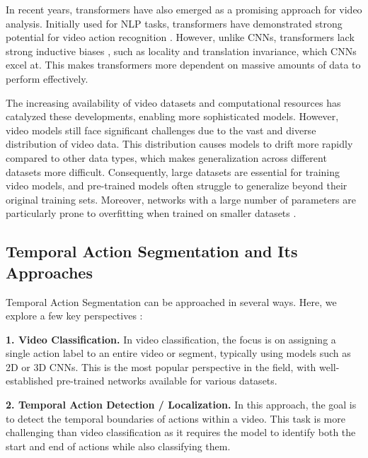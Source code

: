 In recent years, transformers have also emerged as a promising approach for video analysis. Initially used for NLP tasks, transformers have demonstrated strong potential for video action recognition \cite{vivit,dinov2,action-clip}. However, unlike CNNs, transformers lack strong inductive biases \cite{vit}, such as locality and translation invariance, which CNNs excel at. This makes transformers more dependent on massive amounts of data to perform effectively.

The increasing availability of video datasets and computational resources has catalyzed these developments, enabling more sophisticated models. However, video models still face significant challenges due to the vast and diverse distribution of video data. This distribution causes models to drift more rapidly compared to other data types, which makes generalization across different datasets more difficult. Consequently, large datasets are essential for training video models, and pre-trained models often struggle to generalize beyond their original training sets. Moreover, networks with a large number of parameters are particularly prone to overfitting when trained on smaller datasets \cite{resnet-3d}.

\subsection{Temporal Action Segmentation and Its Approaches}

Temporal Action Segmentation can be approached in several ways. Here, we explore a few key perspectives \cite{tas-survey}:

\noindent\textbf{1. Video Classification.} In video classification, the focus is on assigning a single action label to an entire video or segment, typically using models such as 2D or 3D CNNs. This is the most popular perspective in the field, with well-established pre-trained networks available for various datasets. 

\noindent\textbf{2. Temporal Action Detection / Localization.} In this approach, the goal is to detect the temporal boundaries of actions within a video. This task is more challenging than video classification as it requires the model to identify both the start and end of actions while also classifying them.